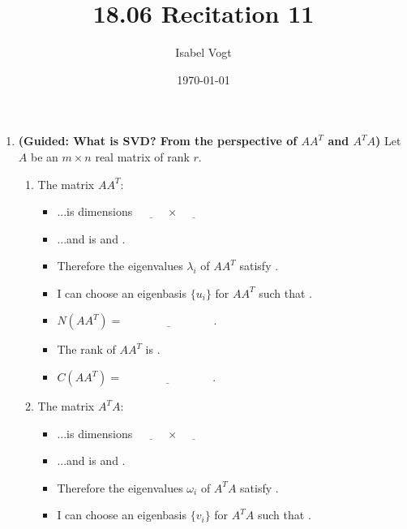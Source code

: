 \documentclass[11pt]{article}
\title{18.06 Recitation 11}
\author{Isabel Vogt}
\date{\today}                                           %
\begin{document}
\maketitle

\begin{enumerate}

\item \textbf{(Guided: What is SVD? From the perspective of $AA^T$ and $A^TA$)}  Let $A$ be an $m \times n$ real matrix of rank $r$.
\begin{enumerate}
\item The matrix $A A^T$: 
\begin{itemize}
\item ...is dimensions $\underline{\phantom{aaaaa}} \times \underline{\phantom{aaaaa}}$ 
\item  ...and is \underline{\phantom{aaaaaaaaaaaaaaaaaaaa}} and \underline{\phantom{aaaaaaaaaaaaaaaaaaaa}}.
\item Therefore the eigenvalues $\lambda_i$ of $AA^T$ satisfy \underline{\phantom{aaaaaaaaaaaaaaaaaaaa}}.
\item I can choose an eigenbasis $\{u_i\}$ for $A A^T$ such that \underline{\phantom{aaaaaaaaaaaaaaaaaaaa}}.
\item $N(AA^T) =  \underline{\phantom{aaaaaaaaaaaaaaa}}$.
\item The rank of $AA^T$ is \underline{\phantom{aaaaaaaaaaaaaaa}}.
\item $C(AA^T) = \underline{\phantom{aaaaaaaaaaaaaaa}}$.
\end{itemize}
\item The matrix $A^TA$: 
\begin{itemize}
\item ...is dimensions $\underline{\phantom{aaaaa}} \times \underline{\phantom{aaaaa}}$ 
\item  ...and is \underline{\phantom{aaaaaaaaaaaaaaaaaaaa}} and \underline{\phantom{aaaaaaaaaaaaaaaaaaaa}}.
\item Therefore the eigenvalues $\omega_i$ of $A^TA$ satisfy \underline{\phantom{aaaaaaaaaaaaaaaaaaaa}}.
\item I can choose an eigenbasis $\{v_i\}$ for $A^TA$ such that \underline{\phantom{aaaaaaaaaaaaaaaaaaaa}}.

\end{itemize}
\end{enumerate}
\end{enumerate}
\end{document}
